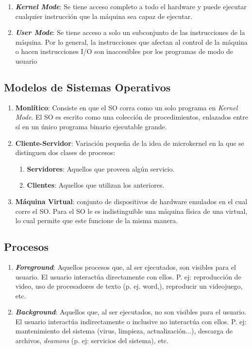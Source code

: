 \documentclass[12pt, a4paper]{article} %
\begin{document}
\begin{enumerate}[resume*]
	\item \textbf{\textit{Kernel Mode}}: Se tiene acceso completo a todo el hardware y puede ejecutar cualquier instrucción que la máquina sea capaz de ejecutar.
	
	\item \textbf{\textit{User Mode}}: Se tiene acceso a solo un subconjunto de las instrucciones de la máquina. Por lo general, la instrucciones que afectan al control de la máquina o hacen instrucciones I/O son inaccesibles por los programas de modo de usuario
\end{enumerate}

\subsection{Modelos de Sistemas Operativos}

\begin{enumerate}[resume*]
	\item \textbf{Monlítico}: Consiste en que el SO corra como un solo programa en \textit{Kernel Mode}. El SO es escrito como una colección de procedimientos, enlazados entre sí en un único programa binario ejecutable grande.

	\item \textbf{Cliente-Servidor}: Variación pequeña de la idea de microkernel en la que se distinguen dos clases de procesos:

	\begin{enumerate}[resume*]
		\item \textbf{Servidores}: Aquellos que proveen algún servicio.
		\item \textbf{Clientes}: Aquellos que utilizan los anteriores.
	\end{enumerate}

	\item \textbf{Máquina Virtual}: conjunto de dispositivos de hardware emulados en el cual corre el SO. Para el SO le es indistinguible una máquina física de una virtual, lo cual permite que este funcione de la misma manera.
\end{enumerate}

\subsection{Procesos}

\begin{enumerate}[resume*]
	\item \textbf{\textit{Foreground}}: Aquellos procesos que, al ser ejecutados, son visibles para el usuario. El usuario interactúa directamente con ellos. P. ej: reproducción de video, uso de procesadores de texto (p. ej. word,), reproducir un videojuego, etc.
	
	\item \textbf{\textit{Background}}: Aquellos que, al ser ejecutados, no son visibles para el usuario. El usuario interactúa indirectamente o inclusive no interactúa con ellos. P. ej: mantenimiento del sistema (virus, limpieza, actualización...), descarga de archivos, \textit{deamons} (p. ej: servicios del sistema), etc.
\end{enumerate}
\end{document}

